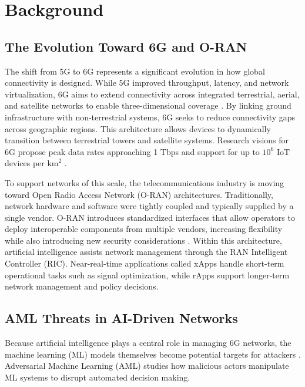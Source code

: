 \documentclass[letterpaper]{article} %
\begin{document}
\section{Background}


\subsection{The Evolution Toward 6G and O-RAN}

The shift from 5G to 6G represents a significant evolution in how global connectivity is designed. While 5G improved throughput, latency, and network virtualization, 6G aims to extend connectivity across integrated terrestrial, aerial, and satellite networks to enable three-dimensional coverage \cite{kaur2025}. By linking ground infrastructure with non-terrestrial systems, 6G seeks to reduce connectivity gaps across geographic regions. This architecture allows devices to dynamically transition between terrestrial towers and satellite systems. Research visions for 6G propose peak data rates approaching 1 Tbps and support for up to $10^6$ IoT devices per $\text{km}^2$ \cite{kaur2025}.

To support networks of this scale, the telecommunications industry is moving toward Open Radio Access Network (O-RAN) architectures. Traditionally, network hardware and software were tightly coupled and typically supplied by a single vendor. O-RAN introduces standardized interfaces that allow operators to deploy interoperable components from multiple vendors, increasing flexibility while also introducing new security considerations \cite{kaur2025}. Within this architecture, artificial intelligence assists network management through the RAN Intelligent Controller (RIC). Near-real-time applications called xApps handle short-term operational tasks such as signal optimization, while rApps support longer-term network management and policy decisions.

\subsection{AML Threats in AI-Driven Networks}

Because artificial intelligence plays a central role in managing 6G networks, the machine learning (ML) models themselves become potential targets for attackers \cite{Catak_Catak_Moldsvor_2021}. Adversarial Machine Learning (AML) studies how malicious actors manipulate ML systems to disrupt automated decision making.
\end{document}
